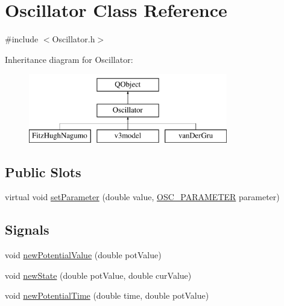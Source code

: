 \hypertarget{class_oscillator}{\section{Oscillator Class Reference}
\label{class_oscillator}
}


{\ttfamily \#include $<$Oscillator.\+h$>$}

Inheritance diagram for Oscillator\+:\begin{figure}[H]
\begin{center}
\leavevmode
\includegraphics[height=3.000000cm]{class_oscillator}
\end{center}
\end{figure}
\subsection*{Public Slots}
\begin{DoxyCompactItemize}
\item 
virtual void \hyperlink{class_oscillator_a56140e76f42036dc6d7a4cd989917edc}{set\+Parameter} (double value, \hyperlink{heart_defines_8h_a79395aba577c2bc57e7ca211ff3476a6}{O\+S\+C\+\_\+\+P\+A\+R\+A\+M\+E\+T\+E\+R} parameter)
\end{DoxyCompactItemize}
\subsection*{Signals}
\begin{DoxyCompactItemize}
\item 
void \hyperlink{class_oscillator_a065af90ddd004f7af4e1d7489b4ea5d6}{new\+Potential\+Value} (double pot\+Value)
\item 
void \hyperlink{class_oscillator_aa48179145afe4bad7b757eefecb6053a}{new\+State} (double pot\+Value, double cur\+Value)
\item 
void \hyperlink{class_oscillator_a949a6e88a1e5b7037ba93d6a9c927b4f}{new\+Potential\+Time} (double time, double pot\+Value)
\end{DoxyCompactItemize}
